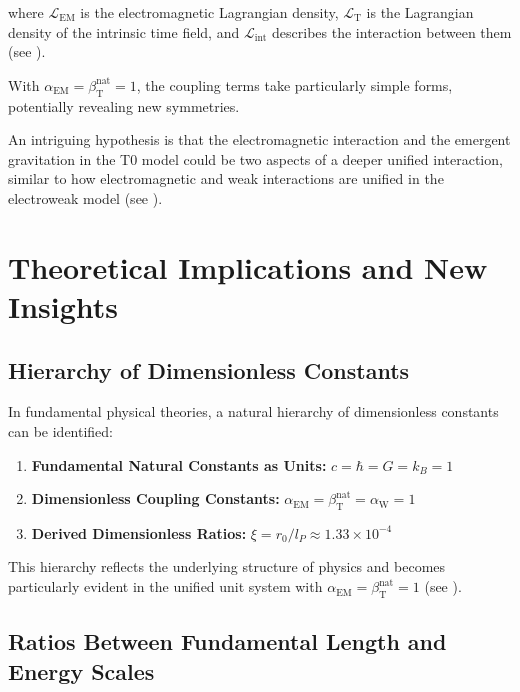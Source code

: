 \documentclass[12pt,a4paper]{article}
\newcommand{\alphaEM}{\alpha_{\text{EM}}}
\newcommand{\betaT}{\beta_{\text{T}}}
\newcommand{\alphaW}{\alpha_{\text{W}}}
\begin{document}
	where \(\mathcal{L}_{\text{EM}}\) is the electromagnetic Lagrangian density, \(\mathcal{L}_{\text{T}}\) is the Lagrangian density of the intrinsic time field, and \(\mathcal{L}_{\text{int}}\) describes the interaction between them (see \cite{pascher_lagrange_2025}).
	
	With \(\alphaEM = \betaT^{\text{nat}} = 1\), the coupling terms take particularly simple forms, potentially revealing new symmetries.
	
	An intriguing hypothesis is that the electromagnetic interaction and the emergent gravitation in the T0 model could be two aspects of a deeper unified interaction, similar to how electromagnetic and weak interactions are unified in the electroweak model (see \cite{pascher_emergente_gravitation_2025}).
	
	\section{Theoretical Implications and New Insights}
	\label{sec:implications}
	
	\subsection{Hierarchy of Dimensionless Constants}
	\label{subsec:hierarchy}
	
	In fundamental physical theories, a natural hierarchy of dimensionless constants can be identified:
	
	\begin{enumerate}[label=\arabic*.]
		\item \textbf{Fundamental Natural Constants as Units:} \(c = \hbar = G = k_B = 1\)
		\item \textbf{Dimensionless Coupling Constants:} \(\alphaEM = \betaT^{\text{nat}} = \alphaW = 1\)
		\item \textbf{Derived Dimensionless Ratios:} \(\xi = r_0/l_P \approx 1.33 \times 10^{-4}\)
	\end{enumerate}
	
	This hierarchy reflects the underlying structure of physics and becomes particularly evident in the unified unit system with \(\alphaEM = \betaT^{\text{nat}} = 1\) (see \cite{pascher_temp_2025}).
	
	\subsection{Ratios Between Fundamental Length and Energy Scales}
	\label{subsec:ratios}
	
\end{document}
